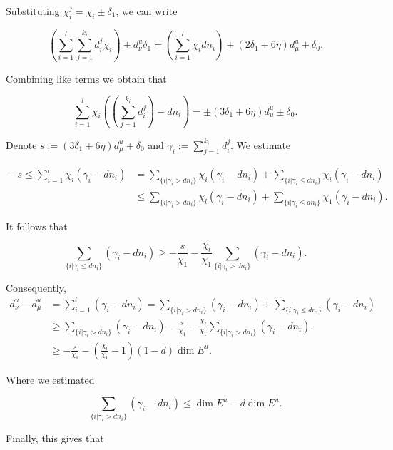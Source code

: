 \documentclass{amsart}
\theoremstyle{plain}
\theoremstyle{definition}
\theoremstyle{remark}
\numberwithin{equation}{section}
\begin{document}
Substituting  $\chi_i^j = \chi_i \pm \delta_1$, we can write

$$  \left(     \sum_{i=1}^l      \sum_{j=1}^{k_i} d_i^j        \chi_i  \right)  \pm d^u_{\nu} \delta_1    =   \left( \sum_{i=1}^l \chi_i d n_i  \right)  \pm (2 \delta_1 + 6 \eta)d^u_{\mu} \pm \delta_0.     $$

Combining like terms we obtain that  


$$      \sum_{i=1}^l   \chi_i \left(    \left( \sum_{j=1}^{k_i} d_i^j     \right) -   d n_i \right)   =   \pm (3 \delta_1 + 6 \eta)d^u_{\mu} \pm \delta_0.$$

Denote $s:= (3 \delta_1 + 6 \eta)d^u_{\mu} + \delta_0$ and $\gamma_i := \sum_{j=1}^{k_i} d_i^j  . $ We estimate

\begin{align*}
 -s \leq \sum_{i=1}^l \chi_i (\gamma_i - d n_i) &= \sum_{\{   i | \gamma_i > d n_i \}}    \chi_i (\gamma_i - d n_i)     +       \sum_{\{   i | \gamma_i \leq d n_i \}}     \chi_i (\gamma_i - d n_i)    \\
 &\leq   \sum_{\{   i | \gamma_i > d n_i \}}    \chi_l (\gamma_i - d n_i)     +       \sum_{\{   i | \gamma_i \leq d n_i \}}     \chi_1 (\gamma_i - d n_i)   .
\end{align*}


It follows that 

$$      \sum_{\{   i | \gamma_i \leq d n_i \}}     (\gamma_i - d n_i)  \geq -\frac{s}{\chi_1} - \frac{\chi_l}{\chi_1}   \sum_{\{   i | \gamma_i > d n_i \}}    (\gamma_i - d n_i) . $$

Consequently,
\begin{align*}
 d^u_{\nu} - d^u_{\mu} &=    \sum_{i=1}^l  (\gamma_i - d n_i) =  \sum_{\{   i | \gamma_i > d n_i \}}     (\gamma_i - d n_i)     +       \sum_{\{   i | \gamma_i \leq d n_i \}}     (\gamma_i - d n_i)  \\
&   \geq           \sum_{\{   i | \gamma_i > d n_i \}}     (\gamma_i - d n_i)       -\frac{s}{\chi_1} - \frac{\chi_l}{\chi_1}   \sum_{\{   i | \gamma_i > d n_i \}}    (\gamma_i - d n_i) .          \\
&  \geq        -\frac{s}{\chi_1} - \left(  \frac{\chi_l}{\chi_1}  - 1  \right)(1-d) \dim E^u.   
\end{align*}

Where we estimated 

$$    \sum_{\{   i | \gamma_i > d n_i \}}    (\gamma_i - d n_i)  \leq   \dim E^u - d \dim E^u.   $$

Finally, this gives that
\end{document}
